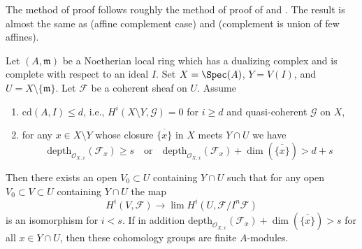 \begin{theorem}
\label{theorem-algebraization-formal-sections}
\begin{reference}
The method of proof follows roughly the method of
proof of \cite[Theorem 1]{Faltings-algebraisation}
and \cite[Satz 2]{Faltings-uber}.
The result is almost the same as
\cite[Theorem 1.1]{MRaynaud-paper} (affine complement case) and
\cite[Theorem 3.9]{MRaynaud-book} (complement is union of few affines).
\end{reference}
Let $(A, \mathfrak m)$ be a Noetherian local ring which has a
dualizing complex and is complete with respect to an ideal $I$.
Set $X = \Spec(A)$, $Y = V(I)$, and $U = X \setminus \{\mathfrak m\}$.
Let $\mathcal{F}$ be a coherent sheaf on $U$.
Assume
\begin{enumerate}
\item $\text{cd}(A, I) \leq d$, i.e.,
$H^i(X \setminus Y, \mathcal{G}) = 0$ for $i \geq d$ and
quasi-coherent $\mathcal{G}$ on $X$,
\item for any $x \in X \setminus Y$ whose closure $\overline{\{x\}}$
in $X$ meets $Y \cap U$ we have
$$
\text{depth}_{\mathcal{O}_{X, x}}(\mathcal{F}_x) \geq s
\quad\text{or}\quad
\text{depth}_{\mathcal{O}_{X, x}}(\mathcal{F}_x)
+ \dim(\overline{\{x\}}) > d + s
$$
\end{enumerate}
Then there exists an open $V_0 \subset U$ containing $Y \cap U$
such that for any open $V_0 \subset V \subset U$ containing $Y \cap U$
the map
$$
H^i(V, \mathcal{F}) \to \lim H^i(U, \mathcal{F}/I^n\mathcal{F})
$$
is an isomorphism for $i < s$. If in addition
$
\text{depth}_{\mathcal{O}_{X, x}}(\mathcal{F}_x) +
\dim(\overline{\{x\}}) > s
$
for all $x \in Y \cap U$, then these cohomology groups are finite $A$-modules.
\end{theorem}

